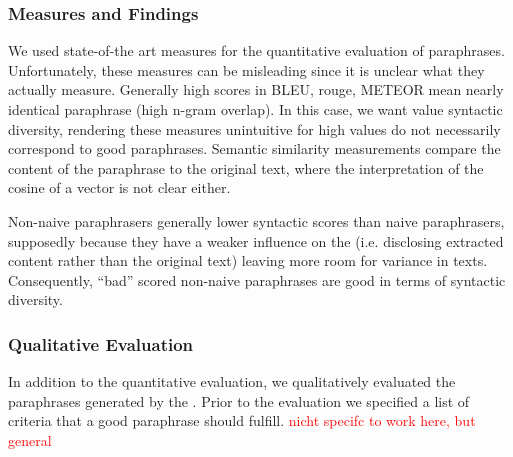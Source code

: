 \subsubsection{Measures and Findings}
\label{subsec:measures_and_findings}

We used state-of-the art measures for the quantitative evaluation of paraphrases. 
Unfortunately, these measures can be misleading since it is unclear what they actually measure.
Generally high scores in BLEU, \ac{rouge}, METEOR mean nearly identical paraphrase (high n-gram overlap).
In this case, we want value syntactic diversity, rendering these measures unintuitive 
for high values do not necessarily correspond to good paraphrases.
Semantic similarity measurements compare the content of the paraphrase to the original text, 
where the interpretation of the cosine of a vector is not clear either.

Non-naive paraphrasers generally lower syntactic scores than naive paraphrasers,
supposedly because they have a weaker influence on the \pgenerator{} 
(i.e. disclosing extracted content rather than the original text)
leaving more room for variance in texts.
Consequently, \enquote{bad} scored non-naive paraphrases are good in terms of syntactic diversity.

\subsubsection{Qualitative Evaluation}
\label{subsec:qualitative_evaluation}

In addition to the quantitative evaluation, we qualitatively evaluated the paraphrases generated by the \pgenerator{}.
Prior to the evaluation we specified a list of criteria that a good paraphrase should fulfill.
\textcolor{red}{nicht specifc to work here, but general}
